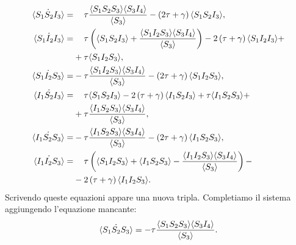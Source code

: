 \begin{align*}
\dot{\angol{S_1S_2I_3}}=&\spa \tau \frac{\angol{S_1S_2S_3}\angol{S_3I_4}}{\angol{S_3}} -\tonde{ 2\tau + \gamma} \angol{S_1S_2I_3},\\
\dot{\angol{S_1I_2I_3}} =&\spa \tau \tonde{ \angol{S_1S_2I_3}+\frac{\angol{S_1I_2S_3}\angol{S_3I_4}}{\angol{S_3} }} -2\tonde{ \tau + \gamma} \angol{S_1I_2I_3} + \\
&+\tau \angol{S_1 I_2 S_3},\\
\dot{\angol{S_1I_2S_3}} =&-\tau \frac{\angol{S_1I_2S_3}\angol{S_3I_4}}{\angol{S_3}} -\tonde{ 2\tau + \gamma} \angol{S_1I_2S_3},\\
\dot{\angol{I_1S_2I_3}} =&\spa \tau  \angol{S_1S_2I_3} -2\tonde{ \tau + \gamma} \angol{I_1S_2I_3} + \tau \angol{I_1S_2S_3}+\\
&+\tau \frac{\angol{I_1S_2S_3}\angol{S_3I_4}}{\angol{S_3}},\\
\dot{\angol{I_1S_2S_3}}=&-\tau \frac{\angol{ I_1S_2S_3}\angol{S_3I_4}}{\angol{S_3}}-\tonde{ 2 \tau + \gamma} \angol{I_1S_2S_3},\\
\dot{\angol{I_1I_2S_3}} =&\spa\tau \tonde{  \angol{S_1I_2S_3}+ \angol{I_1S_2S_3} - \frac{\angol{I_1I_2S_3}\angol{S_3I_4}}{\angol{S_3}}} -\\
&-2\tonde{ \tau + \gamma} \angol{I_1I_2S_3}.
 	\end{align*}
\endgroup
 Scrivendo queste equazioni appare una nuova tripla. Completiamo il sistema aggiungendo l'equazione mancante: 
$$\dot{\langle S_1 S_2 S_3 \rangle} = -\tau\frac{\langle S_1S_2S_3 \rangle\langle S_3I_4 \rangle}{\langle S_3 \rangle}.$$
 
